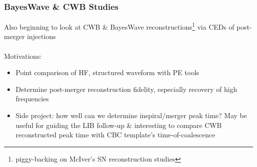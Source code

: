 \documentclass{beamer}
\begin{document}
\begin{frame}
    \frametitle{BayesWave \& CWB Studies}
    Also beginning to look at CWB \& BayesWave reconstructions\footnote{piggy-backing on McIver's SN
    reconstruction studies} via CEDs of post-merger injections\\~\\
    Motivations:
    \begin{itemize}
        \item Point comparison of HF, structured waveform with PE tools
        \item Determine post-merger reconstruction fidelity, especially recovery
            of high frequencies
        \item Side project: how well can we determine inspiral/merger peak time?
            May be useful for guiding the LIB follow-up \& interesting to
            compare CWB reconstructed peak time with CBC template's
            time-of-coalescence
    \end{itemize}
\end{frame}
\end{document}
